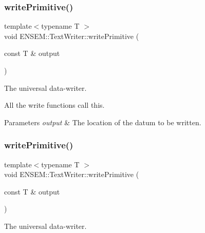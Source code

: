 \subsubsection{\texorpdfstring{writePrimitive()}{writePrimitive()}\hspace{0.1cm}{\footnotesize\ttfamily [1/3]}}
{\footnotesize\ttfamily template$<$typename T $>$ \\
void E\+N\+S\+E\+M\+::\+Text\+Writer\+::write\+Primitive (\begin{DoxyParamCaption}\item[{const T \&}]{output }\end{DoxyParamCaption})\hspace{0.3cm}{\ttfamily [protected]}}



The universal data-\/writer. 

All the write functions call this. 
\begin{DoxyParams}{Parameters}
{\em output} & The location of the datum to be written. \\
\hline
\end{DoxyParams}
\mbox{\label{classENSEM_1_1TextWriter_aca159ff3db64ed918f7e4ddfed7a6d53}} 
\subsubsection{\texorpdfstring{writePrimitive()}{writePrimitive()}\hspace{0.1cm}{\footnotesize\ttfamily [2/3]}}
{\footnotesize\ttfamily template$<$typename T $>$ \\
void E\+N\+S\+E\+M\+::\+Text\+Writer\+::write\+Primitive (\begin{DoxyParamCaption}\item[{const T \&}]{output }\end{DoxyParamCaption})\hspace{0.3cm}{\ttfamily [protected]}}



The universal data-\/writer. 

